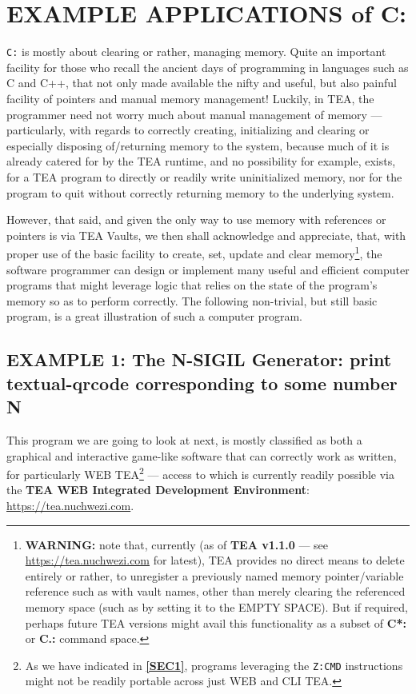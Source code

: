 \documentclass[a4paper, 18pt]{book} %
\begin{document}
\section{EXAMPLE APPLICATIONS of C:}
\label{SECEXAMPC}

\texttt{C:} is mostly about clearing or rather, managing memory. Quite an important facility for those who recall the ancient days of programming in languages such as C and C++, that not only made available the nifty and useful, but also painful facility of pointers and manual memory management! Luckily, in TEA, the programmer need not worry much about manual management of memory --- particularly, with regards to correctly creating, initializing and clearing or especially disposing of/returning memory to the system, because much of it is already catered for by the TEA runtime, and no possibility for example, exists, for a TEA program to directly or readily write uninitialized memory, nor for the program to quit without correctly returning memory to the underlying system.

However, that said, and given the only way to use memory with references or pointers is via TEA Vaults, we then shall acknowledge and appreciate, that, with proper use of the basic facility to create, set, update and clear memory\footnote{\textbf{WARNING:} note that, currently (as of \textbf{TEA v1.1.0} --- see \url{https://tea.nuchwezi.com} for latest), TEA provides no direct means to delete entirely or rather, to unregister a previously named memory pointer/variable reference such as with vault names, other than merely clearing the referenced memory space (such as by setting it to the EMPTY SPACE). But if required, perhaps future TEA versions might avail this functionality as a subset of \textbf{C*:} or \textbf{C.:} command space.}, the software programmer can design or implement many useful and efficient computer programs that might leverage logic that relies on the state of the program's memory so as to perform correctly. The following non-trivial, but still basic program, is a great illustration of such a computer program.


\subsection{EXAMPLE 1: The N-SIGIL Generator: print textual-qrcode corresponding to some number N}
\label{SECEXAMP1C}

This program we are going to look at next, is mostly classified as both a graphical and interactive game-like software that can correctly work as written, for particularly WEB TEA\footnote{As we have indicated in \textbf{\autoref{SEC1}}, programs leveraging the \texttt{Z:CMD} instructions might not be readily portable across just WEB and CLI TEA.} --- access to which is currently readily possible via the \textbf{TEA WEB Integrated Development Environment}: \url{https://tea.nuchwezi.com}.
\end{document}
